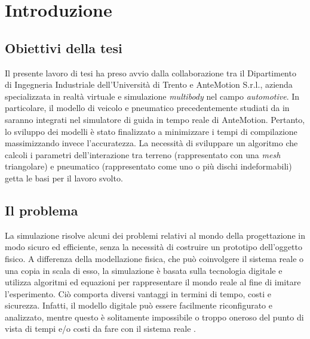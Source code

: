 \chapter{Introduzione}
\label{Introduzione}
%
\section{Obiettivi della tesi}
Il presente lavoro di tesi ha preso avvio dalla collaborazione tra il Dipartimento di Ingegneria Industriale dell'Università di Trento e AnteMotion S.r.l., azienda specializzata in realtà virtuale e simulazione \textit{multibody} nel campo \textit{automotive}. In particolare, il modello di veicolo e pneumatico precedentemente studiati da \citeauthor{Larcher} in \cite{Larcher} saranno integrati nel simulatore di guida in tempo reale di AnteMotion. Pertanto, lo sviluppo dei modelli è stato finalizzato a minimizzare i tempi di compilazione massimizzando invece l'accuratezza. La necessità di sviluppare un algoritmo che calcoli i parametri dell'interazione tra terreno (rappresentato con una \textit{mesh} triangolare) e pneumatico (rappresentato come uno o più dischi indeformabili) getta le basi per il lavoro svolto.
%
\section{Il problema}
La simulazione risolve alcuni dei problemi relativi al mondo della progettazione in modo sicuro ed efficiente, senza la necessità di costruire un prototipo dell'oggetto fisico. A differenza della modellazione fisica, che può coinvolgere il sistema reale o una copia in scala di esso, la simulazione è basata sulla tecnologia digitale e utilizza algoritmi ed equazioni per rappresentare il mondo reale al fine di imitare l'esperimento. Ciò comporta diversi vantaggi in termini di tempo, costi e sicurezza. Infatti, il modello digitale può essere facilmente riconfigurato e analizzato, mentre questo è solitamente impossibile o troppo oneroso del punto di vista di tempi e/o costi da fare con il sistema reale \cite{Anu}.

